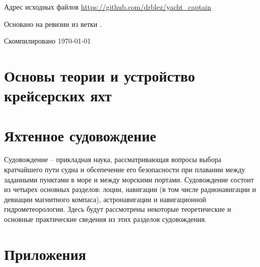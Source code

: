 \documentclass[a4paper, 12pt, twoside, final, book, russian, fittopage, cyremdash, openright]{ncc}
\begin{document}
\frontmatter



\newpage

Адрес исходных файлов \url{https://github.com/drblez/yacht_captain}

Основано на ревизии \texttt{\commit} из ветки \texttt{\branch}.

Скомпилировано \today

\tableofcontents
\listoffigures
\listoftables

\mainmatter

\part{Основы теории и устройство крейсерских яхт}






\part{Яхтенное судовождение}

Судовождение \--- прикладная наука, рассматривающая вопросы выбора
кратчайшего пути судна и обсепечение его безопасности при плавании
между заданными пунктами в море и между морскими портами. Судовождение
состоит из четырех основных разделов: лоции, навигации (в том числе
радионавигации и девиации магнитного компаса), астронавигации и
навигационной гидрометеорологии. Здесь будут рассмотрены некоторые
теоретические и основные практические сведения из этих разделов
судовождения.








\part{Приложения}






\printindex
\end{document}
